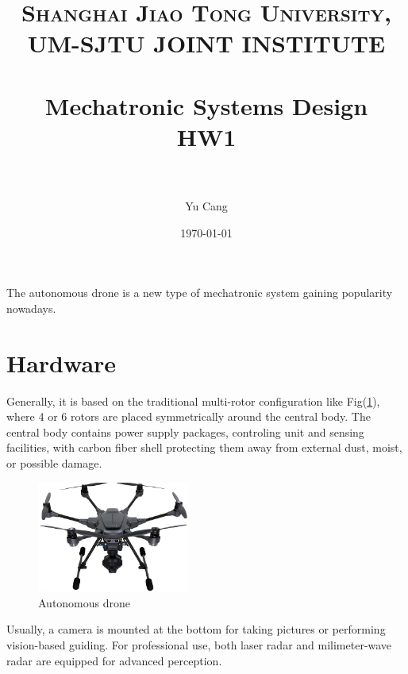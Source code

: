 \documentclass[paper=a4, fontsize=11pt]{scrartcl} %
\title{	
\normalfont \normalsize 
\textsc{Shanghai Jiao Tong University, UM-SJTU JOINT INSTITUTE} \\ [25pt] %
\horrule{0.5pt} \\[0.4cm] %
\huge Mechatronic Systems Design\\ HW1 \\ %
\horrule{2pt} \\[0.5cm] %
}
\author{Yu Cang \quad 018370210001} %
\date{\normalsize \today} %
\numberwithin{equation}{section} %
\numberwithin{figure}{section} %
\numberwithin{table}{section} %
\begin{document}
\maketitle %

The autonomous drone is a new type of mechatronic system gaining popularity nowadays. 
\section{Hardware}
	Generally, it is based on the traditional multi-rotor configuration like Fig(\ref{fig:drone}), where 4 or 6 rotors are placed symmetrically around the central body. The central body contains power supply packages, controling unit and sensing facilities, with carbon fiber shell protecting them away from external dust, moist, or possible damage.
	
	\begin{figure}[!h]
		\centering
		\includegraphics[width=5cm]{pic/drone.jpg}
		\caption{Autonomous drone}
		\label{fig:drone}
	\end{figure}

	Usually, a camera is mounted at the bottom for taking pictures or performing vision-based guiding.
	For professional use, both laser radar and milimeter-wave radar are equipped for advanced perception.
	
\end{document}
